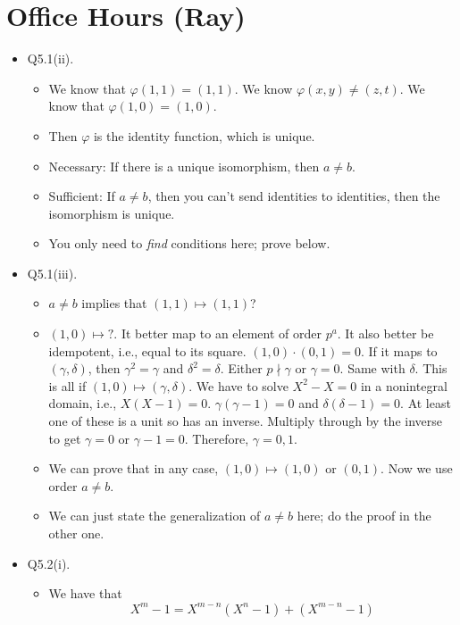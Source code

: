 \documentclass[../notes.tex]{subfiles}
\begin{document}
\section{Office Hours (Ray)}
\begin{itemize}
    \item Q5.1(ii).
    \begin{itemize}
        \item We know that $\varphi(1,1)=(1,1)$. We know $\varphi(x,y)\neq(z,t)$. We know that $\varphi(1,0)=(1,0)$.
        \item Then $\varphi$ is the identity function, which is unique.
        \item Necessary: If there is a unique isomorphism, then $a\neq b$.
        \item Sufficient: If $a\neq b$, then you can't send identities to identities, then the isomorphism is unique.
        \item You only need to \emph{find} conditions here; prove below.
    \end{itemize}
    \item Q5.1(iii).
    \begin{itemize}
        \item $a\neq b$ implies that $(1,1)\mapsto(1,1)$?
        \item $(1,0)\mapsto?$. It better map to an element of order $p^a$. It also better be idempotent, i.e., equal to its square. $(1,0)\cdot(0,1)=0$. If it maps to $(\gamma,\delta)$, then $\gamma^2=\gamma$ and $\delta^2=\delta$. Either $p\nmid\gamma$ or $\gamma=0$. Same with $\delta$. This is all if $(1,0)\mapsto(\gamma,\delta)$. We have to solve $X^2-X=0$ in a nonintegral domain, i.e., $X(X-1)=0$. $\gamma(\gamma-1)=0$ and $\delta(\delta-1)=0$. At least one of these is a unit so has an inverse. Multiply through by the inverse to get $\gamma=0$ or $\gamma-1=0$. Therefore, $\gamma=0,1$.
        \item We can prove that in any case, $(1,0)\mapsto(1,0)$ or $(0,1)$. Now we use order $a\neq b$.
        \item We can just state the generalization of $a\neq b$ here; do the proof in the other one.
    \end{itemize}
    \item Q5.2(i).
    \begin{itemize}
        \item We have that
        \begin{equation*}
            X^m-1 = X^{m-n}(X^n-1)+(X^{m-n}-1)
        \end{equation*}

\end{itemize}
\end{itemize}
\end{document}
